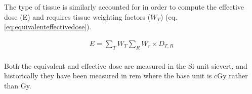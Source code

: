 The type of tissue is similarly accounted for in order to compute the effective dose (E) and requires tissue weighting factors ($W_T$) (eq. \ref{eq:equivalenteffectivedose}\cite{radiationweighting}).

\begin{equation}
\begin{split}
E = \sum_T W_T \sum_R W_{r} \times D_{T,R} \\
\label{eq:equivalenteffectivedose}
\end{split}
\end{equation}

Both the equivalent and effective dose are measured in the Si unit \gls{sievert}, and historically they have been measured in \gls{rem} where the base unit is cGy rather than Gy.






\FloatBarrier





